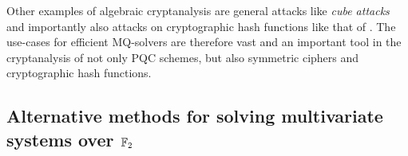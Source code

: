 Other examples of algebraic cryptanalysis are general attacks like \textit{cube attacks} \cite{Videau2011} and importantly also attacks on cryptographic hash functions like that of \cite{10.1007/978-3-642-21702-9_6}. The use-cases for efficient MQ-solvers are therefore vast and an important tool in the cryptanalysis of not only PQC schemes, but also  symmetric ciphers and cryptographic hash functions. 


\subsection{Alternative methods for solving multivariate systems over $\mathbb{F}_2$}

\newpage
